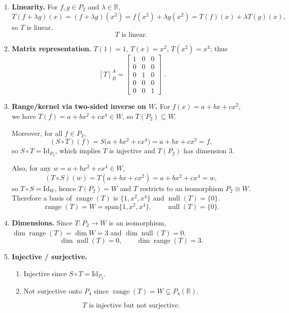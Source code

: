 \documentclass[12pt]{article}
\let\amsboxed\boxed
\renewcommand{\boxed}[1]{\amsboxed{\,#1\,}}
\begin{document}
\begin{enumerate}[label=(\alph*)]
\item \textbf{Linearity.}
For $f,g\in P_2$ and $\lambda\in\mathbb{R}$,
\[
T(f+\lambda g)(x)=(f+\lambda g)(x^2)=f(x^2)+\lambda g(x^2)=T(f)(x)+\lambda T(g)(x),
\]
so $T$ is linear.
\[
\boxed{\,T\text{ is linear.}\,}
\]

\item \textbf{Matrix representation.}
$T(1)=1$, $T(x)=x^2$, $T(x^2)=x^4$; thus
\[
\boxed{\, [T]_{B}^{A}=
\begin{bmatrix}
1&0&0\\
0&0&0\\
0&1&0\\
0&0&0\\
0&0&1
\end{bmatrix}\,}.
\]

\item \textbf{Range/kernel via two-sided inverse on $W$.}
For $f(x)=a+bx+cx^2$, we have $T(f)=a+bx^2+cx^4\in W$, so $T(P_2)\subseteq W$.

Moreover, for all $f\in P_2$,
\[
(S\circ T)(f)=S\bigl(a+bx^2+cx^4\bigr)=a+bx+cx^2=f,
\]
so $S\circ T=\mathrm{Id}_{P_2}$, which implies $T$ is injective and $T(P_2)$ has dimension $3$.

Also, for any $w=a+bx^2+cx^4\in W$,
\[
(T\circ S)(w)=T(a+bx+cx^2)=a+bx^2+cx^4=w,
\]
so $T\circ S=\mathrm{Id}_{W}$, hence $T(P_2)=W$ and $T$ restricts to an isomorphism $P_2\cong W$.
Therefore a basis of $\operatorname{range}(T)$ is $\{1,x^2,x^4\}$ and $\operatorname{null}(T)=\{0\}$.
\[
\boxed{\,\operatorname{range}(T)=W=\mathrm{span}\{1,x^2,x^4\},\qquad \operatorname{null}(T)=\{0\}.\,}
\]

\item \textbf{Dimensions.}
Since $T:P_2\to W$ is an isomorphism, $\dim\operatorname{range}(T)=\dim W=3$ and $\dim\operatorname{null}(T)=0$.
\[
\boxed{\,\dim\operatorname{null}(T)=0,\qquad \dim\operatorname{range}(T)=3.\,}
\]

\item \textbf{Injective / surjective.}
\begin{enumerate}[label=(\roman*)]
\item Injective since $S\circ T=\mathrm{Id}_{P_2}$.
\item Not surjective onto $P_4$ since $\operatorname{range}(T)=W\subsetneq P_4(\mathbb{R})$.
\end{enumerate}
\[
\boxed{\,T\text{ is injective but not surjective.}\,}
\]
\end{enumerate}
\end{document}
